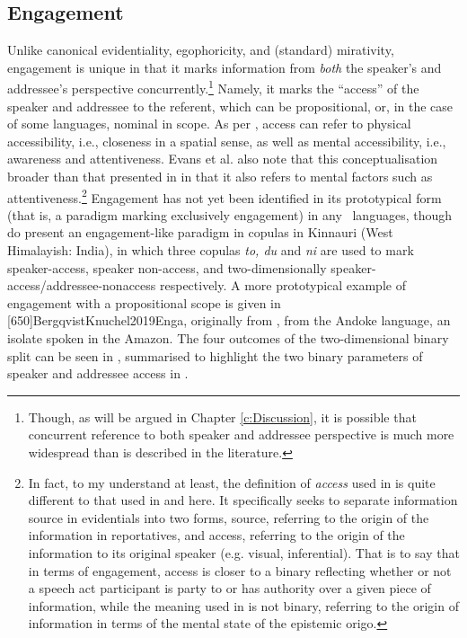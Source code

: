 \subsection{Engagement}\label{s:Intro:EngagementIntro}
Unlike canonical evidentiality, egophoricity, and (standard) mirativity, engagement is unique in that it marks information from \textit{both} the speaker's and addressee's perspective concurrently.\footnote{Though, as will be argued in Chapter \ref{c:Discussion}, it is possible that concurrent reference to both speaker and addressee perspective is much more widespread than is described in the literature.} Namely, it marks the ``access'' \cite[118]{EvansBergqvistSanRoque2018a} of the speaker and addressee to the referent, which can be propositional, or, in the case of some languages, nominal in scope. As per , access can refer to physical accessibility, i.e., closeness in a spatial sense, as well as mental accessibility, i.e., awareness and attentiveness. Evans et al. also note that this conceptualisation broader than that presented in  in that it also refers to mental factors such as attentiveness.\footnote{In fact, to my understand at least, the definition of \textit{access} used in  is quite different to that used in  and here. It specifically seeks to separate information source in evidentials into two forms, source, referring to the origin of the information in reportatives, and access, referring to the origin of the information to its original speaker (e.g. visual, inferential). That is to say that in terms of engagement, access is closer to a binary reflecting whether or not a speech act participant is party to or has authority over a given piece of information, while the meaning used in  is not binary, referring to the origin of information in terms of the mental state of the epistemic origo.} Engagement has not yet been identified in its prototypical form (that is, a paradigm marking exclusively engagement) in any \lfam\ languages, though  do present an engagement-like paradigm in copulas in Kinnauri (West Himalayish: India), in which three copulas \textit{to, du} and \textit{ni} are used to mark speaker-access, speaker non-access, and two-dimensionally speaker-access/addressee-nonaccess respectively. A more prototypical example of engagement with a propositional scope is given in [650]{BergqvistKnuchel2019Enga}, originally from , from the Andoke language, an isolate spoken in the Amazon. The four outcomes of the two-dimensional binary split can be seen in , summarised to highlight the two binary parameters of speaker and addressee access in .

